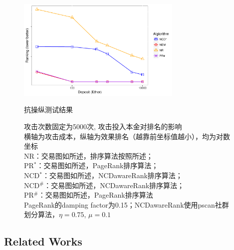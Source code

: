 \begin{figure}[!htbp]
	\centering
	\includegraphics[width=0.7\textwidth]{figs/AttackDeposit.pdf}
	\caption{抗操纵测试结果 }
	\label{fig:antiManipulation}
	\caption*{\footnotesize{攻击次数固定为5000次, 攻击投入本金对排名的影响 \\ 横轴为攻击成本，纵轴为效果排名（越靠前坐标值越小），均为对数坐标 \\
	NR：交易图如所述，排序算法按照所述；\\PR$^*$：交易图如所述，PageRank排序算法；\\ NCD$^*$：交易图如所述，NCDawareRank排序算法；\\ NCD$^{\#}$：交易图如\cite{nem}所述，NCDawareRank排序算法；\\ PR$^{\#}$：交易图如\cite{nem}所述，PageRank排序算法 \\ PageRank的damping factor为0.15；NCDawareRank使用pscan\cite{chang2017mathsf}社群划分算法，$\eta=0.75$, $\mu=0.1$}}
\end{figure}

\subsection{Related Works} \label{subsec:related}

